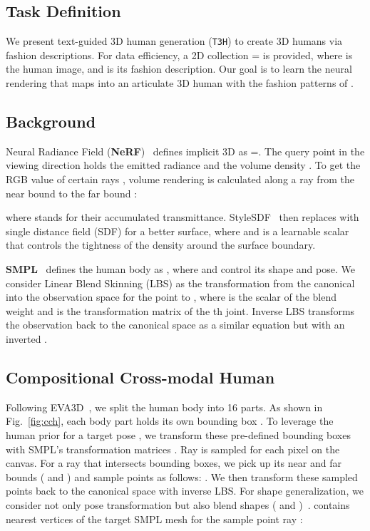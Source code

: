 \documentclass[11pt]{article}
\begin{document}
\subsection{Task Definition}
We present text-guided 3D human generation (\texttt{T3H}) to create 3D humans via fashion descriptions. For data efficiency, a 2D collection = is provided, where  is the human image, and  is its fashion description. Our goal is to learn the neural rendering that maps  into an articulate 3D human with the fashion patterns of .

\subsection{Background}
Neural Radiance Field (\textbf{NeRF})~\cite{mildenhall2020nerf} defines implicit 3D as =. The query point  in the viewing direction  holds the emitted radiance  and the volume density . To get the RGB value  of certain rays , volume rendering is calculated along a ray  from the near bound  to the far bound :

where  stands for their accumulated transmittance. StyleSDF~\cite{or-ei2022style-sdf} then replaces  with single distance field (SDF)  for a better surface, where  and  is a learnable scalar that controls the tightness of the density around the surface boundary.

\vspace{1ex} \noindent \textbf{SMPL}~\cite{bogo2016smpl} defines the human body as , where  and  control its shape and pose. We consider Linear Blend Skinning (LBS) as the transformation from the canonical into the observation space for the point  to , where  is the scalar of the blend weight and  is the transformation matrix of the th joint. Inverse LBS transforms the observation back to the canonical space as a similar equation but with an inverted .

\subsection{Compositional Cross-modal Human}
Following EVA3D~\cite{hong2023eva3d}, we split the human body into 16 parts. As shown in Fig.~\ref{fig:cch}, each body part holds its own bounding box . To leverage the human prior for a target pose , we transform these pre-defined bounding boxes with SMPL's transformation matrices . Ray  is sampled for each pixel on the canvas. For a ray that intersects bounding boxes, we pick up its near and far bounds ( and ) and sample  points as follows: . We then transform these sampled points back to the canonical space with inverse LBS. For shape generalization, we consider not only pose transformation but also blend shapes ( and )~\cite{zheng2021pamir}.  contains  nearest vertices  of the target SMPL mesh for the sample point ray :
\end{document}
